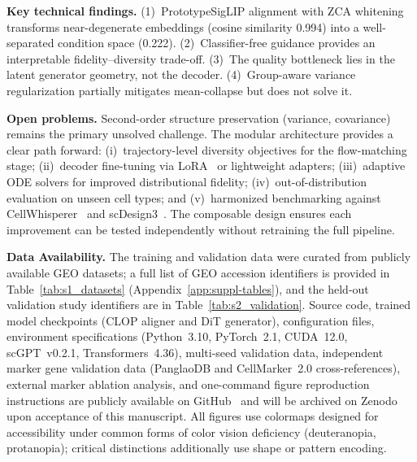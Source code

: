 \textbf{Key technical findings.} (1)~PrototypeSigLIP alignment with ZCA whitening transforms near-degenerate embeddings (cosine similarity 0.994) into a well-separated condition space (0.222). (2)~Classifier-free guidance provides an interpretable fidelity--diversity trade-off. (3)~The quality bottleneck lies in the latent generator geometry, not the decoder. (4)~Group-aware variance regularization partially mitigates mean-collapse but does not solve it.

\textbf{Open problems.} Second-order structure preservation (variance, covariance) remains the primary unsolved challenge. The modular architecture provides a clear path forward: (i)~trajectory-level diversity objectives for the flow-matching stage; (ii)~decoder fine-tuning via LoRA~\citep{ref-scgpt} or lightweight adapters; (iii)~adaptive ODE solvers for improved distributional fidelity; (iv)~out-of-distribution evaluation on unseen cell types; and (v)~harmonized benchmarking against CellWhisperer~\citep{ref-cellwhisperer} and scDesign3~\citep{ref-scdesign3}. The composable design ensures each improvement can be tested independently without retraining the full pipeline.


\textbf{Data Availability.} The training and validation data were curated from publicly available GEO datasets; a full list of GEO accession identifiers is provided in Table~\ref{tab:s1_datasets} (Appendix~\ref{app:suppl-tables}), and the held-out validation study identifiers are in Table~\ref{tab:s2_validation}. Source code, trained model checkpoints (CLOP aligner and DiT generator), configuration files, environment specifications (Python~3.10, PyTorch~2.1, CUDA~12.0, scGPT~v0.2.1, Transformers~4.36), multi-seed validation data, independent marker gene validation data (PanglaoDB and CellMarker~2.0 cross-references), external marker ablation analysis, and one-command figure reproduction instructions are publicly available on GitHub~\citep{ref-clop-dit} and will be archived on Zenodo upon acceptance of this manuscript. All figures use colormaps designed for accessibility under common forms of color vision deficiency (deuteranopia, protanopia); critical distinctions additionally use shape or pattern encoding.

